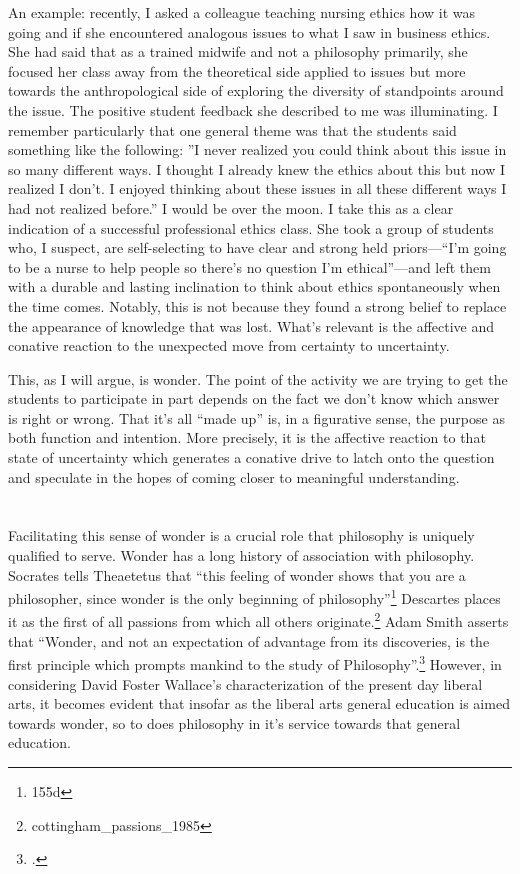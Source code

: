 \documentclass[letterpaper,notitlepage,12pt]{article}
\begin{document}
An example: recently, I asked a colleague teaching nursing ethics how it was
going and if she encountered analogous issues to what I saw in business ethics.
She had said that as a trained midwife and not a philosophy primarily, she
focused her class away from the theoretical side applied to issues but more
towards the anthropological side of exploring the diversity of standpoints
around the issue.
The positive student feedback she described to me was illuminating.
I remember particularly that one general theme was that the students said
something like the following: ''I never realized you could think about this
issue in so many different ways. I thought I already knew the ethics about this
but now I realized I don't. I enjoyed thinking about these issues in all these
different ways I had not realized before.''
I would be over the moon.
I take this as a clear indication of a successful professional ethics class.
She took a group of students who, I suspect, are self-selecting to have clear
and strong held priors---``I'm going to be a nurse to help people so there's no
question I'm ethical''---and left them with a durable and lasting inclination to
think about ethics spontaneously when the time comes.
Notably, this is not because they found a strong belief to replace the
appearance of knowledge that was lost.
What's relevant is the affective and conative reaction to the unexpected move
from certainty to uncertainty.

This, as I will argue, is wonder.
The point of the activity we are trying to get the students to participate in
part depends on the fact we don't know which answer is right or wrong.
That it's all ``made up'' is, in a figurative sense, the purpose as both
function and intention.
More precisely, it is the affective reaction to that state of uncertainty which
generates a conative drive to latch onto the question and speculate in the hopes
of coming closer to meaningful understanding.

\section{}

Facilitating this sense of wonder is a crucial role that philosophy is uniquely
qualified to serve.
Wonder has a long history of association with philosophy.
Socrates tells Theaetetus that ``this feeling of wonder shows that you are a
philosopher, since wonder is the only beginning of philosophy''\footnote{155d}
Descartes places it as the first of all passions from which all others
originate.\footnote[p. 350]{cottingham_passions_1985}
Adam Smith asserts that ``Wonder, and not an expectation of advantage from its
discoveries, is the first principle which prompts mankind to the study of
Philosophy''.\footcite[p. 190]{adam_smith_history_1811}
However, in considering David Foster Wallace's characterization of the
present day liberal arts, it becomes evident that insofar as the
liberal arts general education is aimed towards wonder, so to does philosophy in
it's service towards that general education.
\end{document}

